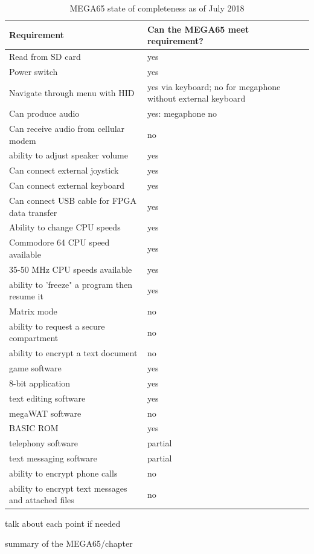 \begin{table}[h!]
  \begin{center}
    \caption{MEGA65 state of completeness as of July 2018}
    \label{tab:table1}
    \begin{tabular}{l|l} %
      \textbf{Requirement} & \textbf{Can the MEGA65 meet requirement?}\\
      \hline
      Read from SD card 									& yes \\
      Power switch											& yes \\
      Navigate through menu with HID						& yes via keyboard; no for megaphone without external keyboard\\
      Can produce audio										& yes: megaphone no \\
      Can receive audio from cellular modem					& no 	\\
      ability to adjust speaker volume						& yes \\
      Can connect external joystick							& yes \\
      Can connect external keyboard							& yes \\
      Can connect USB cable for FPGA data transfer			& yes \\
      Ability to change CPU speeds							& yes \\ 
      Commodore 64 CPU speed available						& yes \\
      35-50 MHz CPU speeds available						& yes \\
      ability to 'freeze" a program then resume it			& yes \\
      Matrix mode											& no \\
      ability to request a secure compartment				& no \\ 
      ability to encrypt a text document					& no \\ 
      game software											& yes \\
      8-bit application										& yes \\
      text editing software									& yes \\
      megaWAT software										& no \\
      BASIC ROM												& yes \\
      telephony software  									& partial \\
  	  text messaging software								& partial \\
  	  ability to encrypt phone calls						& no \\
  	  ability to encrypt text messages and attached files	& no \\
    \end{tabular}
  \end{center}
\end{table}

talk about each point if needed

summary of the MEGA65/chapter